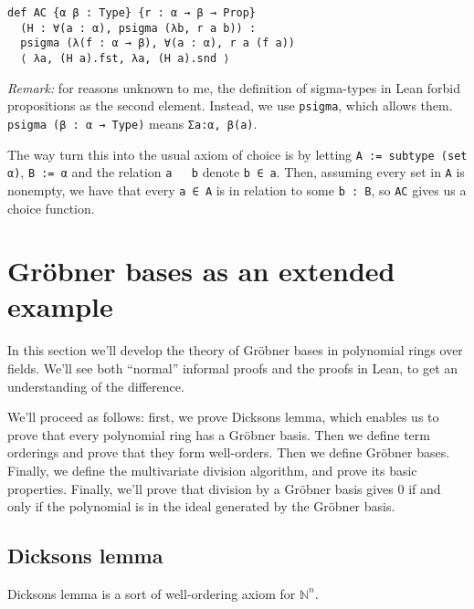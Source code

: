 \documentclass[a4paper, 12pt]{article}
\newcommand{\N}{\mathbb{N}}
\newcommand{\lean}[1]{\texttt{#1}}
\theoremstyle{changedot}
\theoremstyle{changedotbreak}
\theoremstyle{nonumberplain}
\begin{document}
\begin{verbatim}
def AC {α β : Type} {r : α → β → Prop}
  (H : ∀(a : α), psigma (λb, r a b)) :
  psigma (λ(f : α → β), ∀(a : α), r a (f a))
  ⟨ λa, (H a).fst, λa, (H a).snd ⟩
\end{verbatim}
\textit{Remark:} for reasons unknown to me, the definition of sigma-types in Lean forbid propositions as the second element. Instead, we use \lean{psigma}, which allows them. \lean{psigma (β : α → Type)} means \lean{Σa:α, β(a)}.

The way turn this into the usual axiom of choice is by letting \lean{A := subtype (set α)}, \lean{B := α} and the relation \lean{a ~ b} denote \lean{b ∈ a}. Then, assuming every set in \lean{A} is nonempty, we have that every \lean{a ∈ A} is in relation to some \lean{b : B}, so \lean{AC} gives us a choice function.



\section{Gröbner bases as an extended example}
In this section we'll develop the theory of Gröbner bases in polynomial rings over fields. We'll see both ``normal'' informal proofs and the proofs in Lean, to get an understanding of the difference.

We'll proceed as follows: first, we prove Dicksons lemma, which enables us to prove that every polynomial ring has a Gröbner basis. Then we define term orderings and prove that they form well-orders. Then we define Gröbner bases. Finally, we define the multivariate division algorithm, and prove its basic properties. Finally, we'll prove that division by a Gröbner basis gives 0 if and only if the polynomial is in the ideal generated by the Gröbner basis.

\subsection{Dicksons lemma}
Dicksons lemma is a sort of well-ordering axiom for $\N^{n}$.
\end{document}
